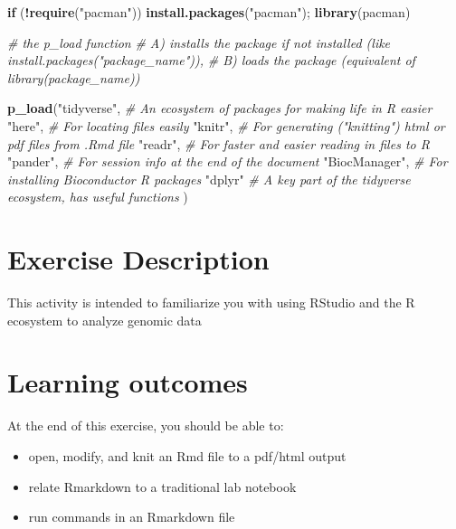 \documentclass[
]{book}
\newenvironment{Shaded}{\begin{snugshade}}{\end{snugshade}}
\newcommand{\CommentTok}[1]{\textcolor[rgb]{0.56,0.35,0.01}{\textit{#1}}}
\newcommand{\ControlFlowTok}[1]{\textcolor[rgb]{0.13,0.29,0.53}{\textbf{#1}}}
\newcommand{\FunctionTok}[1]{\textcolor[rgb]{0.13,0.29,0.53}{\textbf{#1}}}
\newcommand{\NormalTok}[1]{#1}
\newcommand{\SpecialCharTok}[1]{\textcolor[rgb]{0.81,0.36,0.00}{\textbf{#1}}}
\newcommand{\StringTok}[1]{\textcolor[rgb]{0.31,0.60,0.02}{#1}}
\providecommand{\tightlist}{%
  \setlength{\itemsep}{0pt}\setlength{\parskip}{0pt}}
\begin{document}
\begin{Shaded}
\begin{Highlighting}[]
\ControlFlowTok{if}\NormalTok{ (}\SpecialCharTok{!}\FunctionTok{require}\NormalTok{(}\StringTok{"pacman"}\NormalTok{)) }\FunctionTok{install.packages}\NormalTok{(}\StringTok{"pacman"}\NormalTok{); }\FunctionTok{library}\NormalTok{(pacman)}

\CommentTok{\# the p\_load function }
\CommentTok{\#    A) installs the package if not installed (like install.packages("package\_name")),}
\CommentTok{\#    B) loads the package (equivalent of library(package\_name))}

\FunctionTok{p\_load}\NormalTok{(}\StringTok{"tidyverse"}\NormalTok{, }\CommentTok{\# An ecosystem of packages for making life in R easier}
       \StringTok{"here"}\NormalTok{, }\CommentTok{\# For locating files easily}
       \StringTok{"knitr"}\NormalTok{, }\CommentTok{\# For generating ("knitting") html or pdf files from .Rmd file}
       \StringTok{"readr"}\NormalTok{, }\CommentTok{\# For faster and easier reading in files to R}
       \StringTok{"pander"}\NormalTok{, }\CommentTok{\# For session info at the end of the document}
       \StringTok{"BiocManager"}\NormalTok{, }\CommentTok{\# For installing Bioconductor R packages}
       \StringTok{"dplyr"} \CommentTok{\# A key part of the tidyverse ecosystem, has useful functions}
\NormalTok{       )}
\end{Highlighting}
\end{Shaded}

\hypertarget{exercise-description}{%
\section{Exercise Description}\label{exercise-description}}

This activity is intended to familiarize you with using RStudio and the R ecosystem to analyze genomic data

\hypertarget{learning-outcomes}{%
\section{Learning outcomes}\label{learning-outcomes}}

At the end of this exercise, you should be able to:

\begin{itemize}
\tightlist
\item
  open, modify, and knit an Rmd file to a pdf/html output
\item
  relate Rmarkdown to a traditional lab notebook
\item
  run commands in an Rmarkdown file
\end{itemize}
\end{document}
